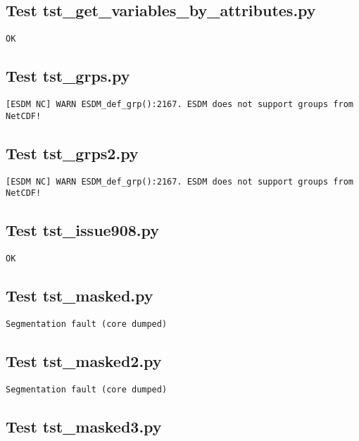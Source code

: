 \subsection{Test tst\_get\_variables\_by\_attributes.py}

\begin{verbatim}
OK
\end{verbatim}

\subsection{Test tst\_grps.py}

\begin{verbatim}
[ESDM NC] WARN ESDM_def_grp():2167. ESDM does not support groups from NetCDF!
\end{verbatim}

\subsection{Test tst\_grps2.py}

\begin{verbatim}
[ESDM NC] WARN ESDM_def_grp():2167. ESDM does not support groups from NetCDF!
\end{verbatim}

\subsection{Test tst\_issue908.py}

\begin{verbatim}
OK
\end{verbatim}

\subsection{Test tst\_masked.py}

\begin{verbatim}
Segmentation fault (core dumped)
\end{verbatim}

\subsection{Test tst\_masked2.py}

\begin{verbatim}
Segmentation fault (core dumped)
\end{verbatim}

\subsection{Test tst\_masked3.py}

